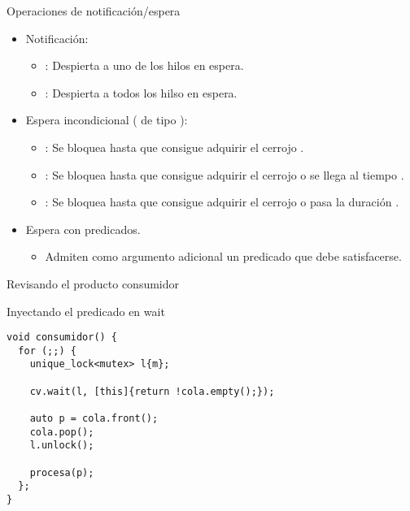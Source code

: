 \begin{frame}{Operaciones de notificación/espera}
\begin{itemize}
  \item Notificación:
    \begin{itemize}
      \item {}: Despierta a uno de los hilos en espera.
      \item {}: Despierta a todos los hilso en espera.
    \end{itemize}
  \item Espera incondicional ( de tipo ):
    \begin{itemize}
      \item {}: Se bloquea hasta que consigue adquirir el cerrojo .
      \item {}: Se bloquea hasta que consigue adquirir el cerrojo  o se llega al tiempo .
      \item {}: Se bloquea hasta que consigue adquirir el cerrojo  o pasa la duración .
    \end{itemize}
  \item Espera con predicados.
    \begin{itemize}
      \item Admiten como argumento adicional un predicado que debe satisfacerse.
    \end{itemize}
\end{itemize}
\end{frame}

\begin{frame}[fragile]{Revisando el producto consumidor}
\begin{block}{Inyectando el predicado en wait}
\begin{lstlisting}
void consumidor() {
  for (;;) {
    unique_lock<mutex> l{m};

    cv.wait(l, [this]{return !cola.empty();});

    auto p = cola.front();
    cola.pop();
    l.unlock();
   
    procesa(p);
  };
}
\end{lstlisting}
\end{block}
\end{frame}

